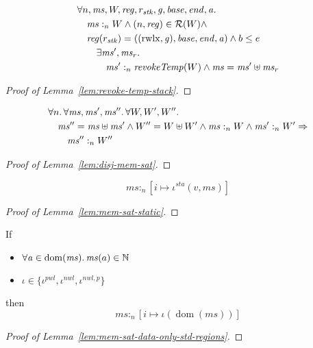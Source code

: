 \documentclass[a4paper]{article}
\DeclareMathOperator{\dom}{dom}
\newcommand{\var}[1]{\mathit{#1}}
\newcommand{\hs}{\var{ms}}
\newcommand{\ms}{\hs}
\newcommand{\gl}{\var{g}}
\newcommand{\addr}{\var{a}}
\newcommand{\start}{\var{base}}
\newcommand{\addrend}{\var{end}}
\newcommand{\reg}{\var{reg}}
\newcommand{\heap}{\var{mem}}
\newcommand{\stk}{\var{stk}}
\newcommand{\nwl}{\var{nwl}}
\newcommand{\pwl}{\var{pwl}}
\newcommand{\sta}{\var{sta}}
\newcommand{\plainfun}[2]{
  \ifthenelse{\equal{#2}{}}
  {\mathit{#1}}
  {\mathit{#1}(#2)}
}
\newcommand{\revokeTemp}[1]{\plainfun{revokeTemp}{#1}}
\newcommand{\heapSat}[3][\heap]{#1 :_{#2} #3}
\newcommand{\memSat}[3][n]{\heapSat[#2]{#1}{#3}}
\newcommand{\asmType}{\plaindom{AsmType}}
\newcommand{\plaindom}[1]{\mathrm{#1}}
\newcommand{\nats}{\mathbb{N}}
\newcommand{\intr}[2]{\mathcal{#1}}
\newcommand{\regintr}[1]{\intr{R}{#1}}
\newcommand{\stdrr}{\regintr{\asmType}}
\newcommand{\npair}[2][n]{\left(#1,#2 \right)}
\newcommand{\plainperm}[1]{\mathrm{#1}}
\newcommand{\rwlx}{\plainperm{rwlx}}
\begin{document}
\begin{lemma}
  \label{lem:revoke-temp-stack}
  \begin{align*}
    & \forall n, \ms, W, \reg, r_\stk,\gl,\start,\addrend,\addr \ldotp\\
    & \quad \memSat{\ms}{W} \land \npair{\reg} \in \stdrr(W) \land \\
    & \quad \reg(r_\stk) = ((\rwlx,\gl),\start,\addrend,\addr) \land b \leq e \\
    & \qquad \exists \ms', \ms_r \ldotp \\
    & \qquad \quad \memSat{\ms'}{\revokeTemp{W}} \land \ms = \ms' \uplus \ms_r
  \end{align*}
\end{lemma}
\begin{proof}[Proof of Lemma~\ref{lem:revoke-temp-stack}]
\end{proof}

\begin{lemma}
  \label{lem:disj-mem-sat}
  \begin{align*}
    & \forall n \ldotp \forall \ms, \ms', \ms'' \ldotp \forall W, W', W'' \ldotp\\
    & \quad \ms'' = \ms \uplus \ms' \land W'' = W \uplus W' \land \memSat{\ms}{W} \land \memSat{\ms'}{W'} \Rightarrow \\
    & \qquad \heapSat[\ms'']{n}{W''}
  \end{align*}
\end{lemma}
\begin{proof}[Proof of Lemma~\ref{lem:disj-mem-sat}]
\end{proof}

\begin{lemma}
  \label{lem:mem-sat-static}
  \[
    \memSat{\ms}{[i \mapsto \iota^\sta(v,\ms)]}
  \]
\end{lemma}
\begin{proof}[Proof of Lemma~\ref{lem:mem-sat-static}]
\end{proof}

\begin{lemma}
  \label{lem:mem-sat-data-only-std-regions}
  If
  \begin{itemize}
  \item $\forall \addr \in \dom(\ms)\ldotp \ms(a) \in \nats$
  \item $\iota \in \{\iota^\pwl,\iota^\nwl,\iota^{\nwl,p} \}$
  \end{itemize}
  then
  \[
    \memSat{\ms}{[i \mapsto \iota(\dom(\ms))]}
  \]
\end{lemma}
\begin{proof}[Proof of Lemma~\ref{lem:mem-sat-data-only-std-regions}]
\end{proof}
\end{document}
